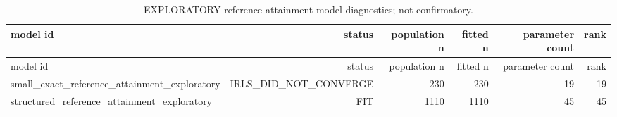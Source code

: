 {\footnotesize
\begin{longtable}{lrrrrr}
\caption{EXPLORATORY reference-attainment model diagnostics; not confirmatory.}\label{tab:aor-exploratory-attainment-diagnostics}\\
\toprule
model id & status & population n & fitted n & parameter count & rank \\
\midrule
\endfirsthead
\toprule
model id & status & population n & fitted n & parameter count & rank \\
\midrule
\endhead
small\_exact\_reference\_attainment\_exploratory & IRLS\_DID\_NOT\_CONVERGE & 230 & 230 & 19 & 19 \\
structured\_reference\_attainment\_exploratory & FIT & 1110 & 1110 & 45 & 45 \\
\bottomrule
\end{longtable}
}
